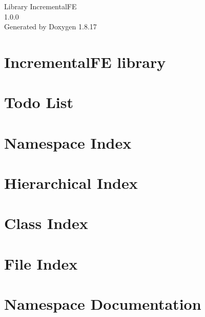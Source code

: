 \let\mypdfximage\pdfximage\def\pdfximage{\immediate\mypdfximage}\documentclass[twoside]{book}
\newcommand{\+}{\discretionary{\mbox{\scriptsize$\hookleftarrow$}}{}{}}
\newcommand{\clearemptydoublepage}{%
  \newpage{\pagestyle{empty}\cleardoublepage}%
}
\begin{document}
\hypersetup{pageanchor=false,
             bookmarksnumbered=true,
             pdfencoding=unicode
            }
\begin{titlepage}
\vspace*{7cm}
\begin{center}%
{\Large Library Incremental\+FE \\[1ex]\large 1.\+0.\+0 }\\
\vspace*{1cm}
{\large Generated by Doxygen 1.8.17}\\
\end{center}
\end{titlepage}
\clearemptydoublepage
{}
\tableofcontents
\clearemptydoublepage
{}
\hypersetup{pageanchor=true}

\chapter{Incremental\+FE library}
\label{index}\hypertarget{index}{}
\chapter{Todo List}
\label{todo}

\chapter{Namespace Index}

\chapter{Hierarchical Index}

\chapter{Class Index}

\chapter{File Index}

\chapter{Namespace Documentation}

\end{document}
